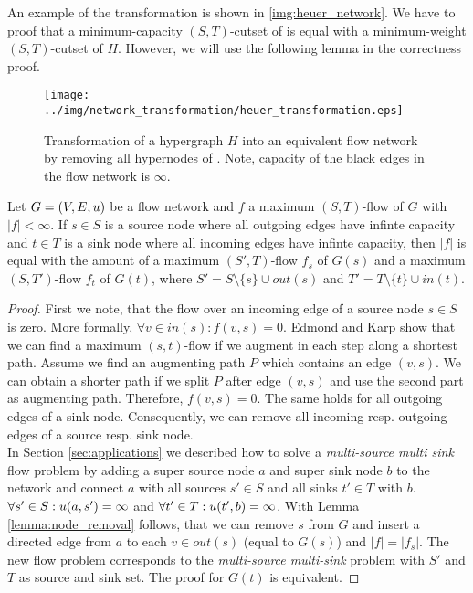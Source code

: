 An example of the transformation is shown in \autoref{img:heuer_network}.
We have to proof that a minimum-capacity $(S,T)$-cutset
of  is equal with a minimum-weight $(S,T)$-cutset of $H$. However,
we will use the following lemma in the correctness proof.

\begin{figure}
\centering
\texttt{[image: ../img/network\_transformation/heuer\_transformation.eps]}
\caption{Transformation of a hypergraph $H$ into an equivalent flow network  by removing
         all hypernodes of . Note, capacity of the black edges in the flow network is $\infty$.}
\label{img:heuer_network}
\end{figure}

\begin{lemma}
\label{lemma:source_and_sink_removal}
Let $G = (V,E,u)$ be a flow network and $f$ a maximum $(S,T)$-flow of $G$ with $|f| < \infty$.
If $s \in S$ is a source node where all outgoing edges have infinte capacity and
$t \in T$ is a sink node where all incoming edges have infinte capacity, then
$|f|$ is equal with the amount of a maximum $(S',T)$-flow $f_s$ of $G(s)$ and a maximum
$(S,T')$-flow $f_t$ of $G(t)$, where $S' = S\setminus \{s\} \cup out(s)$ 
and $T' = T \setminus \{t\} \cup in(t)$.
\end{lemma}

\begin{proof}
First we note, that the flow over an incoming edge of a source node $s \in S$ is zero.
More formally, $\forall v \in in(s): f(v,s) = 0$. Edmond and Karp \cite{edmonds1972theoretical} 
show that we can find a maximum $(s,t)$-flow if we augment in each step along a shortest path. 
Assume we find an augmenting path $P$ which contains an edge $(v,s)$. We
can obtain a shorter path if we split $P$ after edge $(v,s)$ and use the second part as
augmenting path. Therefore, $f(v,s) = 0$. The same holds for all outgoing edges of a sink
node. Consequently, we can remove all incoming resp. outgoing edges of a source resp. sink node. \\
In Section \ref{sec:applications} we described how to solve a \emph{multi-source 
multi sink} flow problem by adding a super source node $a$ and super sink node $b$ to the network
and connect $a$ with all sources $s' \in S$ and all sinks $t' \in T$ with $b$.
$\forall s' \in S: u(a,s') = \infty$ and $\forall t' \in T: u(t',b) = \infty$. With Lemma
\ref{lemma:node_removal} follows, that we can remove $s$ from $G$ and insert
a directed edge from $a$ to each $v \in out(s)$ (equal to $G(s)$) and $|f| = |f_s|$. The new flow problem
corresponds to the \emph{multi-source multi-sink} problem with $S'$ and $T$ as source
and sink set. The proof for $G(t)$ is equivalent.
\end{proof}


